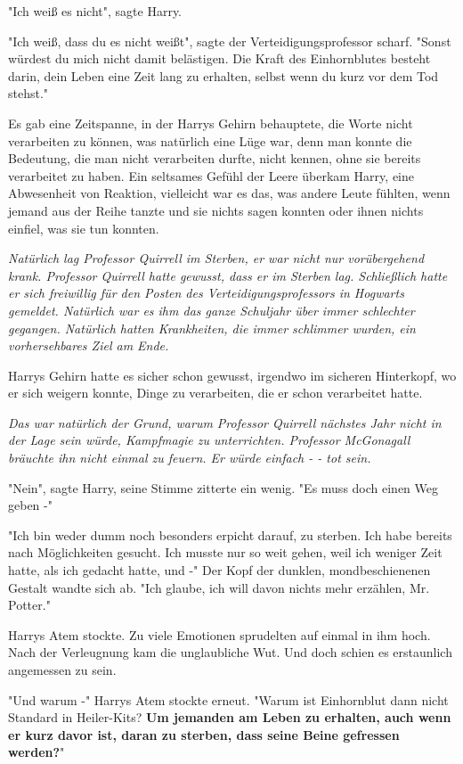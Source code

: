 {"Ich weiß es nicht", sagte Harry.

"Ich weiß, dass du es nicht weißt", sagte der Verteidigungsprofessor scharf. "Sonst würdest du mich nicht damit belästigen. Die Kraft des Einhornblutes besteht darin, dein Leben eine Zeit lang zu erhalten, selbst wenn du kurz vor dem Tod stehst."

Es gab eine Zeitspanne, in der Harrys Gehirn behauptete, die Worte nicht verarbeiten zu können, was natürlich eine Lüge war, denn man konnte die Bedeutung, die man nicht verarbeiten durfte, nicht kennen, ohne sie bereits verarbeitet zu haben. Ein seltsames Gefühl der Leere überkam Harry, eine Abwesenheit von Reaktion, vielleicht war es das, was andere Leute fühlten, wenn jemand aus der Reihe tanzte und sie nichts sagen konnten oder ihnen nichts einfiel, was sie tun konnten.

\emph{Natürlich lag Professor Quirrell im Sterben, er war nicht nur vorübergehend krank. Professor Quirrell hatte gewusst, dass er im Sterben lag. Schließlich hatte er sich freiwillig für den Posten des Verteidigungsprofessors in Hogwarts gemeldet. Natürlich war es ihm das ganze Schuljahr über immer schlechter gegangen. Natürlich hatten Krankheiten, die immer schlimmer wurden, ein vorhersehbares Ziel am Ende.}

Harrys Gehirn hatte es sicher schon gewusst, irgendwo im sicheren Hinterkopf, wo er sich weigern konnte, Dinge zu verarbeiten, die er schon verarbeitet hatte.

\emph{Das war natürlich der Grund, warum Professor Quirrell nächstes Jahr nicht in der Lage sein würde, Kampfmagie zu unterrichten. Professor McGonagall bräuchte ihn nicht einmal zu feuern. Er würde einfach - - tot sein.}

"Nein", sagte Harry, seine Stimme zitterte ein wenig. "Es muss doch einen Weg geben -"

"Ich bin weder dumm noch besonders erpicht darauf, zu sterben. Ich habe bereits nach Möglichkeiten gesucht. Ich musste nur so weit gehen, weil ich weniger Zeit hatte, als ich gedacht hatte, und -" Der Kopf der dunklen, mondbeschienenen Gestalt wandte sich ab. "Ich glaube, ich will davon nichts mehr erzählen, Mr. Potter."

Harrys Atem stockte. Zu viele Emotionen sprudelten auf einmal in ihm hoch. Nach der Verleugnung kam die unglaubliche Wut. Und doch schien es erstaunlich angemessen zu sein.

"Und warum -" Harrys Atem stockte erneut. "Warum ist Einhornblut dann nicht Standard in Heiler-Kits? \textbf{Um jemanden am Leben zu erhalten, auch wenn er kurz davor ist, daran zu sterben, dass seine Beine gefressen werden?}"

}
